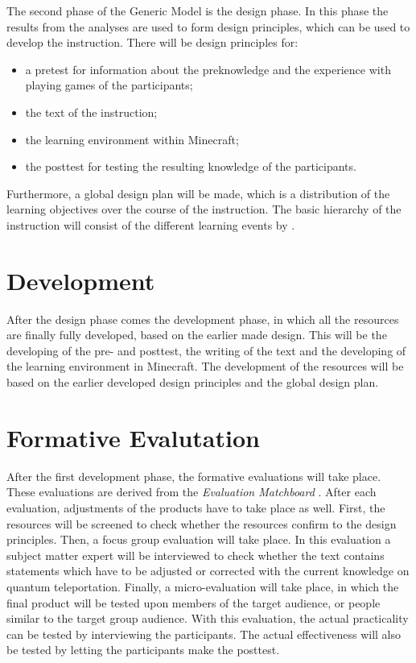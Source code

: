\documentclass[12pt]{report} %
\begin{document}
The second phase of the Generic Model \cite{genericmodel} is the design phase. In this phase the results from the analyses are used to form design principles, which can be used to develop the instruction. There will be design principles for:
\begin{itemize}
\item a pretest for information about the preknowledge and the experience with playing games of the participants;
\item the text of the instruction;
\item the learning environment within Minecraft;
\item the posttest for testing the resulting knowledge of the participants.
\end{itemize}
Furthermore, a global design plan will be made, which is a distribution of the learning objectives over the course of the instruction. The basic hierarchy of the instruction will consist of the different learning events by .

\section{Development}

After the design phase comes the development phase, in which all the resources are finally fully developed, based on the earlier made design. This will be the developing of the pre- and posttest, the writing of the text and the developing of the learning environment in Minecraft. The development of the resources will be based on the earlier developed design principles and the global design plan.

\section{Formative Evalutation}

After the first development phase, the formative evaluations will take place. These evaluations are derived from the \emph{Evaluation Matchboard} \cite{evamatchboard}. After each evaluation, adjustments of the products have to take place as well. First, the resources will be screened to check whether the resources confirm to the design principles. Then, a focus group evaluation will take place. In this evaluation a subject matter expert will be interviewed to check whether the text contains statements which have to be adjusted or corrected with the current knowledge on quantum teleportation. Finally, a micro-evaluation will take place, in which the final product will be tested upon members of the target audience, or people similar to the target group audience. With this evaluation, the actual practicality can be tested by interviewing the participants. The actual effectiveness will also be tested by letting the participants make the posttest.
\end{document}
